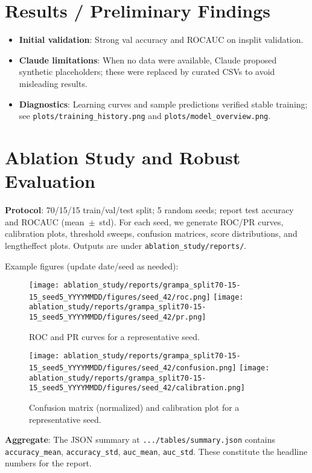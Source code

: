 \documentclass{article}
\begin{document}
\section{Results / Preliminary Findings}
\begin{itemize}[leftmargin=*,nosep]
  \item \textbf{Initial validation}: Strong val accuracy and ROC\-AUC on in\-split validation.
  \item \textbf{Claude limitations}: When no data were available, Claude proposed synthetic placeholders; these were replaced by curated CSVs to avoid misleading results.
  \item \textbf{Diagnostics}: Learning curves and sample predictions verified stable training; see \texttt{plots/training\_history.png} and \texttt{plots/model\_overview.png}.
\end{itemize}

\section{Ablation Study and Robust Evaluation}
\textbf{Protocol}: 70/15/15 train/val/test split; 5 random seeds; report test accuracy and ROC\-AUC (mean~$\pm$~std). For each seed, we generate ROC/PR curves, calibration plots, threshold sweeps, confusion matrices, score distributions, and length\-effect plots. Outputs are under \texttt{ablation\_study/reports/}.

\noindent Example figures (update date/seed as needed):
\begin{figure}[h]
  \centering
  \texttt{[image: ablation\_study/reports/grampa\_split70-15-15\_seed5\_YYYYMMDD/figures/seed\_42/roc.png]}
  \texttt{[image: ablation\_study/reports/grampa\_split70-15-15\_seed5\_YYYYMMDD/figures/seed\_42/pr.png]}
  \caption{ROC and PR curves for a representative seed.}
\end{figure}

\begin{figure}[h]
  \centering
  \texttt{[image: ablation\_study/reports/grampa\_split70-15-15\_seed5\_YYYYMMDD/figures/seed\_42/confusion.png]}
  \texttt{[image: ablation\_study/reports/grampa\_split70-15-15\_seed5\_YYYYMMDD/figures/seed\_42/calibration.png]}
  \caption{Confusion matrix (normalized) and calibration plot for a representative seed.}
\end{figure}

\noindent \textbf{Aggregate}: The JSON summary at \texttt{.../tables/summary.json} contains \texttt{accuracy\_mean}, \texttt{accuracy\_std}, \texttt{auc\_mean}, \texttt{auc\_std}. These constitute the headline numbers for the report.
\end{document}
